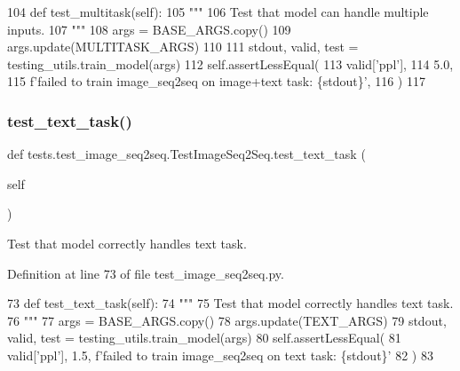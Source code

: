 \begin{DoxyCode}
104     \textcolor{keyword}{def }test\_multitask(self):
105         \textcolor{stringliteral}{"""}
106 \textcolor{stringliteral}{        Test that model can handle multiple inputs.}
107 \textcolor{stringliteral}{        """}
108         args = BASE\_ARGS.copy()
109         args.update(MULTITASK\_ARGS)
110 
111         stdout, valid, test = testing\_utils.train\_model(args)
112         self.assertLessEqual(
113             valid[\textcolor{stringliteral}{'ppl'}],
114             5.0,
115             f\textcolor{stringliteral}{'failed to train image\_seq2seq on image+text task: \{stdout\}'},
116         )
117 
\end{DoxyCode}
\mbox{\label{classtests_1_1test__image__seq2seq_1_1TestImageSeq2Seq_a1cf523643d9304f97566768912456f46}} 
\subsubsection{\texorpdfstring{test\+\_\+text\+\_\+task()}{test\_text\_task()}}
{\footnotesize\ttfamily def tests.\+test\+\_\+image\+\_\+seq2seq.\+Test\+Image\+Seq2\+Seq.\+test\+\_\+text\+\_\+task (\begin{DoxyParamCaption}\item[{}]{self }\end{DoxyParamCaption})}

\begin{DoxyVerb}Test that model correctly handles text task.
\end{DoxyVerb}
 

Definition at line 73 of file test\+\_\+image\+\_\+seq2seq.\+py.


\begin{DoxyCode}
73     \textcolor{keyword}{def }test\_text\_task(self):
74         \textcolor{stringliteral}{"""}
75 \textcolor{stringliteral}{        Test that model correctly handles text task.}
76 \textcolor{stringliteral}{        """}
77         args = BASE\_ARGS.copy()
78         args.update(TEXT\_ARGS)
79         stdout, valid, test = testing\_utils.train\_model(args)
80         self.assertLessEqual(
81             valid[\textcolor{stringliteral}{'ppl'}], 1.5, f\textcolor{stringliteral}{'failed to train image\_seq2seq on text task: \{stdout\}'}
82         )
83 
\end{DoxyCode}


